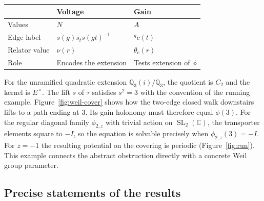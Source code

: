 \documentclass[12pt,letterpaper]{article}
\numberwithin{equation}{section}
\theoremstyle{plain}
\theoremstyle{definition}
\newcommand{\C}{\mathbb{C}}
\newcommand{\Q}{\mathbb{Q}}
\newcommand{\act}[2]{{}^{#1}\!#2}          %
\DeclareMathOperator{\SL}{SL}
\begin{document}
\begin{center}
\begin{tabular}{@{}p{}p{}p{}@{}}
\toprule
& Voltage & Gain \\
\midrule
Values & $N$ & $A$ \\
Edge label & $s(g)s_ts(gt)^{-1}$ & $\act{g}{c(t)}$ \\
Relator value & $\nu(r)$ & $\theta_c(r)$ \\
Role & Encodes the extension & Tests extension of $\phi$ \\
\bottomrule
\end{tabular}
\end{center}

For the unramified quadratic extension $\Q_3(i)/\Q_3$, the quotient is $C_2$ and the kernel is $E^\times$. The lift $s$ of $\tau$ satisfies $s^2=3$ with the convention of the running example. Figure~\ref{fig:weil-cover} shows how the two-edge closed walk downstairs lifts to a path ending at $3$. Its gain holonomy must therefore equal $\phi(3)$. For the regular diagonal family $\phi_{2,z}$ with trivial action on $\SL_2(\C)$, the transporter elements square to $-I$, so the equation is solvable precisely when $\phi_{2,z}(3)=-I$. For $z=-1$ the resulting potential on the covering is periodic (Figure~\ref{fig:run}). This example connects the abstract obstruction directly with a concrete Weil group parameter.

\subsection{Precise statements of the results}
\end{document}
